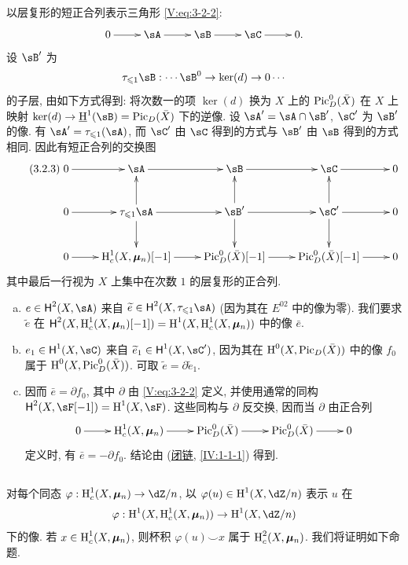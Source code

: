 以层复形的短正合列表示三角形 \eqref{V:eq:3-2-2}:
\[\xymatrix{
  0 \ar[r]
    & \sA \ar[r]
    & \sB \ar[r]
    & \sC \ar[r]
    & 0 \text{.}
}\]
设 $\sB'$ 为
\[
  \tau_{\leqslant 1} \sB : \cdots \sB^0 \to \ker(d) \to 0 \cdots
\]
的子层, 由如下方式得到: 将次数一的项 $\ker(d)$ 换为
$X$ 上的 $\operatorname{Pic}_D^0(\bar X)$ 在 $X$ 上映射
$\ker(d)\to \underline\h^1(\sB) = \pic_D(\bar X)$ 下的逆像.
设 $\sA'=\sA\cap \sB'$, $\sC'$ 为 $\sB'$ 的像.
有 $\sA'=\tau_{\leqslant 1}(\sA)$,
而 $\sC'$ 由 $\sC$ 得到的方式与 $\sB'$ 由 $\sB$ 得到的方式相同.
因此有短正合列的交换图
\begin{equation*}\tag{3.2.3}\label{V:eq:3-2-3}
\xymatrix{
  0 \ar[r]
    & \sA \ar[r]
    & \sB \ar[r]
    & \sC \ar[r]
    & 0 \\
  0 \ar[r]
    & \tau_{\leqslant 1} \sA \ar[r] \ar[u] \ar[d]
    & \sB' \ar[r] \ar[u] \ar[d]
    & \sC' \ar[r] \ar[u] \ar[d]
    & 0 \\
  0 \ar[r]
    & \h_c^1(X,\dmu_n)[-1] \ar[r]
    & \pic_D^0(\bar X)[-1] \ar[r]
    & \pic_D^0(\bar X)[-1] \ar[r]
    & 0
}
\end{equation*}
其中最后一行视为 $X$ 上集中在次数 $1$ 的层复形的正合列.
\begin{enumerate}[a)]
  \item $e\in \hh^2(X,\sA)$ 来自
    $\widetilde e\in \hh^2(X,\tau_{\leqslant 1}\sA)$
    (因为其在 $E^{02}$ 中的像为零).
    我们要求 $\widetilde e$ 在
    $\operatorname{\mathsf{H}}^2(X,\operatorname{H}_c^1(X,{\bm\mu}_n)[-1]) = \operatorname{H}^1(X,\operatorname{H}_c^1(X,{\bm\mu}_n))$ 中的像 $\bar e$.
  \item $e_1\in \hh^1(X,\sC)$ 来自 $\widetilde e_1\in \hh^1(X,\sC')$,
    因为其在 $\operatorname{H}^0(X,\operatorname{Pic}_D(\bar X))$ 中的像 $f_0$ 属于 $\operatorname{H}^0(X,\operatorname{Pic}_D^0(\bar X))$.
    可取 $\widetilde e=\partial \widetilde e_1$.
  \item 因而 $\bar e = \partial f_0$, 其中 $\partial$ 由 \eqref{V:eq:3-2-2} 定义,
    并使用通常的同构 $\hh^2(X,\sF[-1]) = \h^1(X,\sF)$.
    这些同构与 $\partial$ 反交换,
    因而当 $\partial$ 由正合列
    \[\xymatrix{
      0 \ar[r]
        & \h_c^1(X,\dmu_n) \ar[r]
        & \pic_D^0(\bar X) \ar[r]
        & \pic_D^0(\bar X) \ar[r]
        & 0
    }\]
    定义时, 有 $\bar e=-\partial f_0$.
    结论由 (\hyperref[IV]{闭链}, \ref{IV:1-1-1}) 得到.
\end{enumerate}

\subsection{}\label{V:3-3}

对每个同态 $\varphi:\h_c^1(X,\dmu_n)\to \dZ/n$,
以 $\varphi(u)\in \h^1(X,\dZ/n)$ 表示 $u$ 在
\[
  \varphi:\h^1(X,\h_c^1(X,\dmu_n)) \to \h^1(X,\dZ/n)
\]
下的像.
若 $x\in \operatorname{H}_c^1(X,{\bm\mu}_n)$,
则杯积 $\varphi(u)\smallsmile x$ 属于 $\operatorname{H}_c^2(X,{\bm\mu}_n)$. 我们将证明如下命题.

